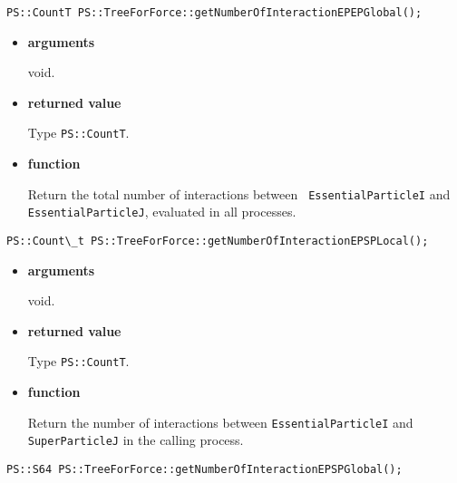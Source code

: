\begin{screen}
\begin{verbatim}
PS::CountT PS::TreeForForce::getNumberOfInteractionEPEPGlobal();
\end{verbatim}
\end{screen}

\begin{itemize}

\item {\bf arguments}

void.

\item {\bf returned value}

Type {\tt PS::CountT}.

\item {\bf function}

Return the total number of interactions between {\tt
EssentialParticleI} and {\tt EssentialParticleJ}, evaluated in all
processes.

\end{itemize}

\begin{screen}
\begin{verbatim}
PS::Count\_t PS::TreeForForce::getNumberOfInteractionEPSPLocal();
\end{verbatim}
\end{screen}

\begin{itemize}

\item {\bf arguments}

void.

\item {\bf returned value}

Type {\tt PS::CountT}.

\item {\bf function}

Return the number of interactions between {\tt EssentialParticleI} and
{\tt SuperParticleJ} in the calling process.


\end{itemize}

\begin{screen}
\begin{verbatim}
PS::S64 PS::TreeForForce::getNumberOfInteractionEPSPGlobal();
\end{verbatim}
\end{screen}

